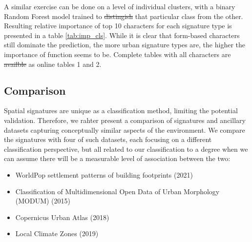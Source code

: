 \documentclass[fleqn,10pt]{wlscirep}
\providecommand{\DIFadd}[1]{{\protect\color{blue}\uwave{#1}}} %
\providecommand{\DIFdel}[1]{{\protect\color{red}\sout{#1}}}                      %
\providecommand{\DIFaddbegin}{} %
\providecommand{\DIFaddend}{} %
\providecommand{\DIFdelbegin}{} %
\providecommand{\DIFdelend}{} %
\begin{document}
A similar exercise can be done on a level of individual clusters, with a binary Random Forest model trained
to \DIFdelbegin \DIFdel{distingish }\DIFdelend \DIFaddbegin \DIFadd{distinguish }\DIFaddend that particular class from the other. Resulting relative importance of top 10 characters for each signature type
is presented in a table \ref{tab:imp_cls}. While it is clear that form-based characters still dominate the prediction,
the more urban signature types are, the higher the importance of function seems to be. Complete tables
with all characters are \DIFdelbegin \DIFdel{availble }\DIFdelend \DIFaddbegin \DIFadd{available }\DIFaddend as online tables 1 and 2.

\subsection*{Comparison}

Spatial signatures are unique as a classification method, limiting the potential
validation. Therefore, we rahter present a comparison of signatures and ancillary datasets capturing
conceptually similar aspects of the environment. We compare the signatures with four of
such datasets, each focusing on a different classification perspective, but all related
to our classification to a degree when we can assume there will be a measurable level of
association between the two:

\begin{itemize}
    \item WorldPop settlement patterns of building footprints (2021)\cite{jochem2021tools}
    \item Classification of Multidimensional Open Data of Urban Morphology (MODUM) (2015)\cite{alexiou2016}
    \item Copernicus Urban Atlas (2018)\cite{eea2018}
    \item Local Climate Zones (2019)\cite{demuzere2019mapping}
\end{itemize}
\end{document}
